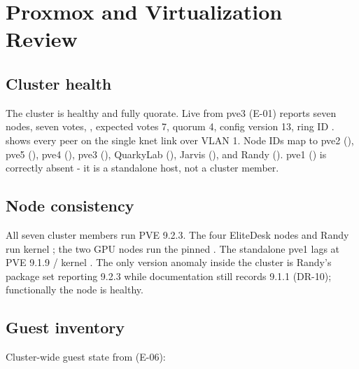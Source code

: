 \section{Proxmox and Virtualization Review}\label{sec:virt}

\subsection{Cluster health}

The cluster is healthy and fully quorate. Live  from pve3 (E-01) reports
seven nodes, seven votes, , expected votes 7, quorum 4, config version 13,
ring ID .  shows every peer  on the
single knet link over VLAN 1. Node IDs map to pve2 (), pve5 (),
pve4 (), pve3 (), QuarkyLab (), Jarvis (),
and Randy (). pve1 () is correctly absent - it is a standalone host,
not a cluster member.

\subsection{Node consistency}

All seven cluster members run PVE 9.2.3. The four EliteDesk nodes and Randy run kernel
; the two GPU nodes run the pinned . The standalone
pve1 lags at PVE 9.1.9 / kernel . The only version anomaly inside the
cluster is Randy's package set reporting 9.2.3 while documentation still records 9.1.1
(DR-10); functionally the node is healthy.

\subsection{Guest inventory}

Cluster-wide guest state from  (E-06):

